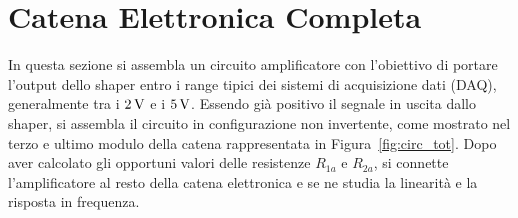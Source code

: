 
\section{Catena Elettronica Completa}\label{sec:catena}
In questa sezione si assembla un circuito amplificatore con l'obiettivo di portare l'output dello shaper
entro i range tipici dei sistemi di acquisizione dati (DAQ), generalmente tra i $2\,\si{\volt}$ e i $5\,\si{\volt}$.
Essendo già positivo il segnale in uscita dallo shaper, si assembla il circuito in configurazione non invertente,
come mostrato nel terzo e ultimo modulo della catena rappresentata in Figura~\ref{fig:circ_tot}. Dopo aver calcolato gli opportuni valori delle resistenze $R_{1a}$ e $R_{2a}$,
si connette l'amplificatore al resto della catena elettronica e se ne studia la linearità e la risposta in
frequenza.

